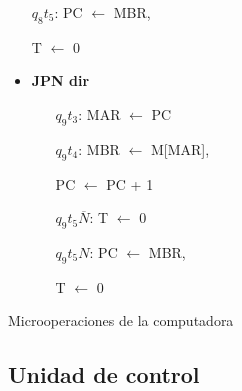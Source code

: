 \documentclass{article}
\begin{document}
\begin{table}[!htbp]
{\begin{minipage}{\textwidth}
\begin{multicols}{2}
\begin{itemize}
\begin{enumerate}[itemsep=-1ex]
                            \item[$q_8t_5$:]
                                PC $\leftarrow$ MBR,
                    
                                T $\leftarrow$ 0
                        \end{enumerate}
                \end{itemize}
                
                
                
                
                \begin{itemize}
                    \item \textbf{JPN dir}
                        \begin{enumerate}[itemsep=-1ex] 
                            \item[$q_9t_3$:]
                                MAR $\leftarrow$ PC
                            
                        \item[$q_9t_4$:] 
                            MBR $\leftarrow$ M[MAR],
                            
                            PC $\leftarrow$ PC + 1
                   
                        \item[$q_9t_5\overline{N}$:]
                            T $\leftarrow$ 0
                        
                        \item[$q_9t_5N$:]
                            PC $\leftarrow$ MBR,
                            
                            T $\leftarrow$ 0
                        
                        \end{enumerate}
                \end{itemize}
            
            \end{multicols}
        
        \end{minipage}
    
    }

    \caption{Microoperaciones de la computadora}
    \label{tab:microoperaciones_tiempos}
\end{table}

\newpage

\subsection{Unidad de control}
\end{document}
